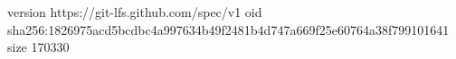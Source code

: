 version https://git-lfs.github.com/spec/v1
oid sha256:1826975acd5bcdbc4a997634b49f2481b4d747a669f25e60764a38f799101641
size 170330
